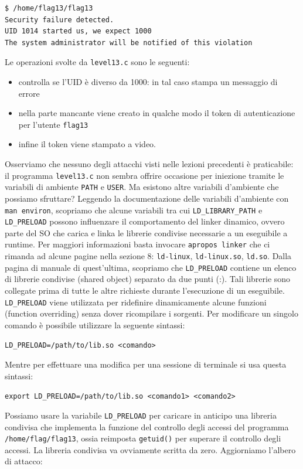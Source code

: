 \begin{mdframed}[backgroundcolor=white!20,shadow=false]
\begin{lstlisting}
$ /home/flag13/flag13
Security failure detected.
UID 1014 started us, we expect 1000
The system administrator will be notified of this violation
\end{lstlisting}
\end{mdframed}
Le operazioni svolte da \texttt{level13.c} sono le seguenti:
\begin{itemize}
    \item controlla se l'UID è diverso da 1000: in tal caso stampa un messaggio di errore
    \item nella parte mancante viene creato in qualche modo il token di autenticazione per l'utente \texttt{flag13}
    \item infine il token viene stampato a video. 
\end{itemize}
Osserviamo che nessuno degli attacchi visti nelle lezioni precedenti è praticabile: il programma \texttt{level13.c} non sembra offrire occasione per iniezione tramite le variabili di ambiente \texttt{PATH} e \texttt{USER}. Ma esistono altre variabili d'ambiente che possiamo sfruttare? Leggendo la documentazione delle variabili d'ambiente con \texttt{man environ}, scopriamo che alcune variabili tra cui \texttt{LD\_LIBRARY\_PATH} e \texttt{LD\_PRELOAD} possono influenzare il comportamento del linker dinamico, ovvero parte del SO che carica e linka le librerie condivise necessarie a un eseguibile a runtime. Per maggiori informazioni basta invocare \texttt{apropos linker} che ci rimanda ad alcune pagine nella sezione 8: \texttt{ld-linux}, \texttt{ld-linux.so}, \texttt{ld.so}. Dalla pagina di manuale di quest'ultima, scopriamo che \texttt{LD\_PRELOAD} contiene un elenco di librerie condivise (shared object) separato da due punti (:). Tali librerie sono collegate prima di tutte le altre richieste durante l'esecuzione di un eseguibile. \texttt{LD\_PRELOAD} viene utilizzata per ridefinire dinamicamente alcune funzioni (function overriding) senza dover ricompilare i sorgenti. Per modificare un singolo comando è possibile utilizzare la seguente sintassi:
\begin{center}
    \texttt{LD\_PRELOAD=/path/to/lib.so <comando>}
\end{center}
Mentre per effettuare una modifica per una sessione di terminale si usa questa sintassi:
\begin{center}
    \texttt{export LD\_PRELOAD=/path/to/lib.so <comando1> <comando2>}
\end{center}
Possiamo usare la variabile \texttt{LD\_PRELOAD} per caricare in anticipo una libreria condivisa che implementa la funzione del controllo degli accessi del programma \texttt{/home/flag/flag13}, ossia reimposta \texttt{getuid()} per superare il controllo degli accessi. La libreria condivisa va ovviamente scritta da zero. Aggiorniamo l'albero di attacco:

